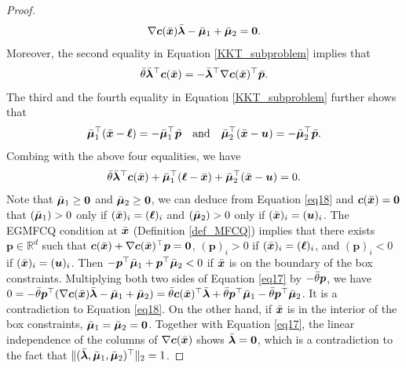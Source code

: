 \documentclass[aos]{imsart}
\numberwithin{equation}{section}
\theoremstyle{plain}
\begin{document}
\begin{appendix}
\begin{proof}
    \begin{equation}
    \label{eq17}
        \nabla \bm{c}(\Bar{\bm{x}}) \Bar{\bm{\lambda}} - \Bar{\bm{\mu}}_{1} + \Bar{\bm{\mu}}_{2} = \bm{0}.
    \end{equation}
    Moreover, the second equality in Equation \eqref{KKT_subproblem} implies that
    \begin{equation*}
        \Bar{\theta} \Bar{\bm{\lambda}}^{\top} \bm{c}(\Bar{\bm{x}}) =  - \Bar{\bm{\lambda}}^{\top} \nabla \bm{c}(\Bar{\bm{x}})^{\top} \Bar{\bm{p}}.
    \end{equation*}
     The third and the fourth equality in Equation \eqref{KKT_subproblem} further shows that
     \begin{equation*}
         \Bar{\bm{\mu}}_{1}^{\top} (\Bar{\bm{x}} - \bm{\ell}) = -\Bar{\bm{\mu}}_{1}^{\top} \Bar{\bm{p}} \quad \text{and} \quad \Bar{\bm{\mu}}_{2}^{\top} (\Bar{\bm{x}} - \bm{u}) = -\Bar{\bm{\mu}}_{2}^{\top} \Bar{\bm{p}}.
     \end{equation*}
     Combing with the above four equalities, we have
     \begin{equation}
     \label{eq18}
          \Bar{\theta} \Bar{\bm{\lambda}}^{\top} \bm{c}(\Bar{\bm{x}}) + \Bar{\bm{\mu}}_{1}^{\top} (\bm{\ell} - \Bar{\bm{x}}) + \Bar{\bm{\mu}}_{2}^{\top} (\Bar{\bm{x}} - \bm{u}) = 0.
     \end{equation}
     Note that $\Bar{\bm{\mu}}_{1} \geq \bm{0}$ and $\Bar{\bm{\mu}}_{2} \geq \bm{0}$, we can deduce from Equation \eqref{eq18} and $\bm{c}(\Bar{\bm{x}}) = \bm{0}$ that $(\Bar{\bm{\mu}}_{1}) > 0$ only if $(\Bar{\bm{x}})_{i} = (\bm{\ell})_i$ and $(\Bar{\bm{\mu}}_{2}) > 0$ only if $(\Bar{\bm{x}})_{i} = (\bm{u})_i$. The EGMFCQ condition at $\Bar{\bm{x}}$ (Definition \ref{def_MFCQ}) implies that there exists $\bm{p} \in \mathbb{R}^{d}$ such that $\bm{c}(\Bar{\bm{x}}) + \nabla \bm{c}(\Bar{\bm{x}})^{\top} \bm{p} = \bm{0}$, $(\bm{p})_{i} > 0$ if $(\Bar{\bm{x}})_{i} = (\bm{\ell})_i$, and $(\bm{p})_{i} < 0$ if $(\Bar{\bm{x}})_{i} = (\bm{u})_i$. Then $- \bm{p}^{\top} \Bar{\bm{\mu}}_{1} + \bm{p}^{\top} \Bar{\bm{\mu}}_{2} < 0$ if $\Bar{\bm{x}}$ is on the boundary of the box constraints. 
     Multiplying both two sides of Equation \eqref{eq17} by $-\Bar{\theta}\bm{p}$, we have $0 = -\Bar{\theta} \bm{p}^{\top}(\nabla \bm{c}(\Bar{\bm{x}}) \Bar{\bm{\lambda}} - \Bar{\bm{\mu}}_{1} + \Bar{\bm{\mu}}_{2}) = \Bar{\theta}\bm{c}(\Bar{\bm{x}})^{\top} \Bar{\bm{\lambda}} + \Bar{\theta} \bm{p}^{\top} \Bar{\bm{\mu}}_{1} - \Bar{\theta} \bm{p}^{\top} \Bar{\bm{\mu}}_{2}$. It is a contradiction to Equation \eqref{eq18}. On the other hand, if $\Bar{\bm{x}}$ is in the interior of the box constraints, $\Bar{\bm{\mu}}_{1} = \Bar{\bm{\mu}}_{2} = \bm{0}$. Together with Equation \eqref{eq17}, the linear independence of the columns of $\nabla \bm{c}(\Bar{\bm{x}})$ shows $\Bar{\bm{\lambda}} = \bm{0}$, which is a contradiction to the fact that $\|(\Bar{\bm{\lambda}}, \Bar{\bm{\mu}}_{1}, \Bar{\bm{\mu}}_{2})^{\top}\|_2 = 1$.
\end{proof}



\end{appendix}
\end{document}
